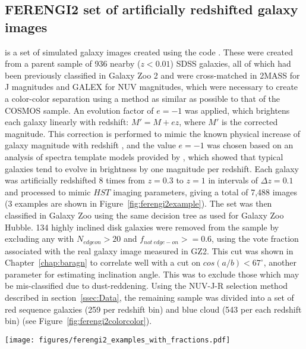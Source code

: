 \subsection{FERENGI2 set of artificially redshifted galaxy images}
\label{ssec:ferengi}
 is a set of simulated galaxy images created using the \ferengi{} code \citep{Barden2008}. These were created from a parent sample of 936 nearby ($z<0.01$) SDSS galaxies, all of which had been previously classified in Galaxy Zoo 2 and were cross-matched in 2MASS \citep{Skrutskie2006} for J magnitudes and GALEX \citep{Martin2005} for NUV magnitudes, which were necessary to create a color-color separation using a method as similar as possible to that of the COSMOS sample.  An evolution factor of $e=-1$ was applied, which brightens each galaxy linearly with redshift: $M' = M + ez$, where $M'$ is the corrected magnitude. This correction is performed to mimic the known physical increase of galaxy magnitude with redshift \citep{Lilly1998,Loveday2011}, and the value $e=-1$ was chosen based on an analysis of spectra template models provided by \citet{Brinchmann2004a}, which showed that typical galaxies tend to evolve in brightness by one magnitude per redshift. Each galaxy was artificially redshifted 8 times from $z=0.3$ to $z=1$ in intervals of $\Delta z = 0.1$ and processed to mimic $HST$ imaging parameters, giving a total of 7,488 images (3 examples are shown in Figure~\ref{fig:ferengi2example}).  The set was then classified in Galaxy Zoo using the same decision tree as used for Galaxy Zoo Hubble. 134 highly inclined disk galaxies were removed from the sample by excluding any with $N_{edgeon}>20$ and $f_{not~edge-on}>=0.6$, using the vote fraction associated with the real galaxy image measured in GZ2. This cut was shown in Chapter~\ref{chap:baragn} to correlate well with a cut on $cos(a/b)<67^\circ$, another parameter for estimating inclination angle. This was to exclude those which may be mis-classified due to dust-reddening.  Using the NUV-J-R selection method described in section~\ref{ssec:Data}, the remaining sample was divided into a set of red sequence galaxies (259 per redshift bin) and blue cloud (543 per each redshift bin) (see Figure~\ref{fig:ferengi2colorcolor}).
\begin{figure*}
\centering
\texttt{[image: figures/ferengi2\_examples\_with\_fractions.pdf]}
\caption{Example images of three galaxies artificially redshifted with the \ferengi{} code. The left image in each row is a real SDSS gri-composite image; the four to the right are images generated by \ferengi{} at varying redshifts, processed to mimic $HST/COSMOS$ imaging. The \ffeatures{} vote fraction for each simulated image is given; this value tends to decrease for each galaxy as it is processed to be viewed at higher redshifts. }
\label{fig:ferengi2example}
\end{figure*}

